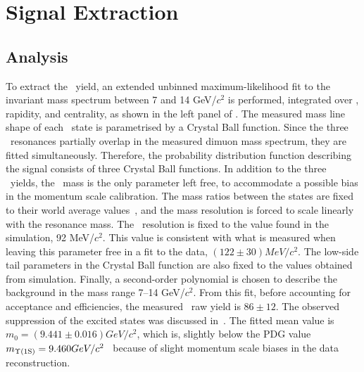 \section{Signal Extraction}
\label{sec:signal-extraction}
\subsection{\texorpdfstring{\PgUa}{Upsilon(1S)} Analysis}
\label{sec:upsilon}
To extract the \PgUa\ yield, an extended unbinned maximum-likelihood
fit to the \mumu invariant mass spectrum between 7 and 14 GeV/$c^2$ is
performed, integrated over \pt, rapidity, and centrality, as shown in
the left panel of . The measured mass line shape
of each \PgU\ state is parametrised by a Crystal Ball function. Since
the three \PgU\ resonances partially overlap in the measured dimuon
mass spectrum, they are fitted simultaneously. Therefore, the
probability distribution function describing the signal consists of
three Crystal Ball functions. In addition to the three \PgUn\ yields,
the \PgUa\ mass is the only parameter left free, to accommodate a
possible bias in the momentum scale calibration. The mass ratios
between the states are fixed to their world average
values~\cite{Nakamura:2010zzi}, and the mass resolution is forced to
scale linearly with the resonance mass. The \PgUa\ resolution is fixed
to the value found in the simulation, 92 MeV/$c^2$. This value is
consistent with what is measured when leaving this parameter free in a
fit to the data, $(122 \pm 30) MeV/c^2$. The low-side tail parameters in
the Crystal Ball function are also fixed to the values obtained from
simulation. Finally, a second-order polynomial is chosen to describe
the background in the mass range 7--14 GeV/$c^2$. From this fit, before
accounting for acceptance and efficiencies, the measured \PgUa\ raw
yield is $86 \pm 12$. The observed suppression of the excited states
was discussed in~\cite{Chatrchyan:2011pe}. The fitted mean value is
$m_0 = (9.441\pm0.016) GeV/c^2$, which is, slightly below the PDG 
value $m_{\Upsilon\text{(1S)}} = 9.460 GeV/c^2$~\cite{Nakamura:2010zzi} because
of slight momentum scale biases in the data reconstruction.

